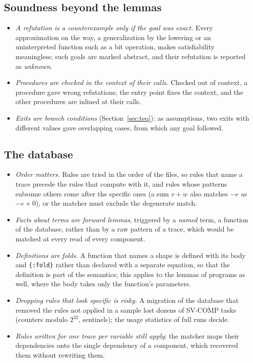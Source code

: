 \subsection{Soundness beyond the lemmas}
\begin{itemize}[nosep]
\item \emph{A refutation is a counterexample only if the goal was exact.} Every approximation on the way, a
  generalization by the lowering or an uninterpreted function such as a bit operation, makes satisfiability
  meaningless; such goals are marked abstract, and their refutation is reported as \emph{unknown}.
\item \emph{Procedures are checked in the context of their calls.} Checked out of context, a procedure gave wrong
  refutations; the entry point fixes the context, and the other procedures are inlined at their calls.
\item \emph{Exits are branch conditions} (Section~\ref{sec:teq}): as assumptions, two exits with different values gave
  overlapping cases, from which any goal followed.
\end{itemize}

\subsection{The database}
\begin{itemize}[nosep]
\item \emph{Order matters.} Rules are tried in the order of the files, so rules that name a trace precede the rules that
  compute with it, and rules whose patterns subsume others come after the specific ones (a sum $v + w$ also matches
  $-e$ as $-e + 0$), or the matcher must exclude the degenerate match.
\item \emph{Facts about terms are forward lemmas}, triggered by a \emph{named} term, a function of the database, rather
  than by a raw pattern of a trace, which would be matched at every read of every component.
\item \emph{Definitions are folds.} A function that names a shape is defined with its body and \texttt{\{:fold\}}
  rather than declared with a separate equation, so that the definition is part of the semantics; this applies to the
  lemmas of programs as well, where the body takes only the function's parameters.
\item \emph{Dropping rules that look specific is risky.} A migration of the database that removed the rules not applied
  in a sample lost dozens of SV-COMP tasks (counters modulo $2^{32}$, sentinels); the usage statistics of full runs
  decide.
\item \emph{Rules written for one trace per variable still apply}: the matcher maps their dependencies onto the single
  dependency of a component, which recovered them without rewriting them.
\end{itemize}

